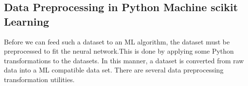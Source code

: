 

\subsection{Data Preprocessing in Python Machine scikit Learning}

Before we can feed such a dataset to an ML algorithm, the dataset must be preprocessed to fit the neural network.This is done by applying some Python transformations to the datasets. In this manner, a dataset is converted from raw data into a ML compatible data set. There are several data preprocessing transformation utilities.
